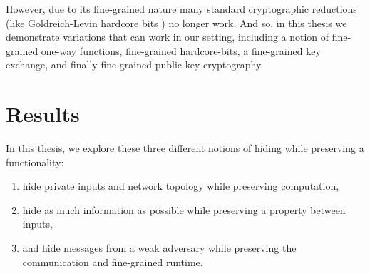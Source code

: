 However, due to its fine-grained nature many standard cryptographic reductions (like Goldreich-Levin hardcore bits \cite{hardCoreBitsAndXorLemmaFromGL}) no longer work. And so, in this thesis we demonstrate variations that can work in our setting, including a notion of fine-grained one-way functions, fine-grained hardcore-bits, a fine-grained key exchange, and finally fine-grained public-key cryptography.

\section{Results}
In this thesis, we explore these three different notions of hiding while preserving a functionality:
\begin{enumerate}
	\item hide private inputs and network topology while preserving computation,
	\item hide as much information as possible while preserving a property between inputs,
	\item and hide messages from a weak adversary while preserving the communication and fine-grained runtime.
\end{enumerate}

